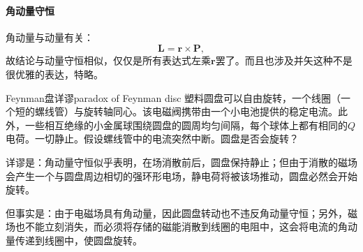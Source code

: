 \paragraph{角动量守恒}
角动量与动量有关：
\[
    \bm L=\bm r\times\bm P,
\]
故结论与动量守恒相似，仅仅是所有表达式左乘$\bm r$罢了。而且也涉及并矢这种不是很优雅的表达，特略。
\begin{example}{Feynman盘详谬}{paradox of Feynman disc}
    塑料圆盘可以自由旋转，一个线圈（一个短的螺线管）与旋转轴同心。该电磁阀携带由一个小电池提供的稳定电流。此外，一些相互绝缘的小金属球围绕圆盘的圆周均匀间隔，每个球体上都有相同的$Q$电荷。一切静止。假设螺线管中的电流突然中断。圆盘是否会旋转？

    详谬是：角动量守恒似乎表明，在场消散前后，圆盘保持静止；但由于消散的磁场会产生一个与圆盘周边相切的强环形电场，静电荷将被该场推动，圆盘必然会开始旋转。

    但事实是：由于电磁场具有角动量，因此圆盘转动也不违反角动量守恒；另外，磁场也不能立刻消失，而必须将存储的磁能消散到线圈的电阻中，这会将电流的角动量传递到线圈中，使圆盘旋转。
\end{example}
